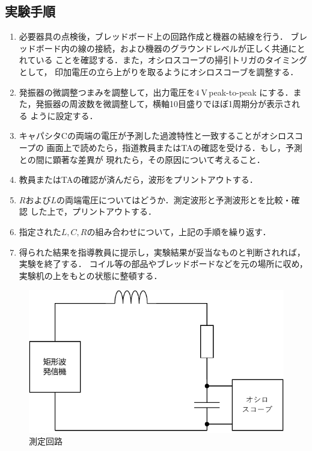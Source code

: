 \subsection{実験手順}    
    \begin{enumerate}
        \item 必要器具の点検後，ブレッドボード上の回路作成と機器の結線を行う．
        ブレッドボード内の線の接続，およひ機器のグラウンドレベルが正しく共通にとれている
        ことを確認する．また，オシロスコープの掃引トリガのタイミングとして，
        印加電圧の立ら上がりを取るようにオシロスコーブを調整する．

        \item  発振器の微調整つまみを調整して，出力電圧を$4 \mathrm{~V}$\,peak-to-peak
        にする．また，発振器の周波数を微調整して，横軸10目盛りでほぼ1周期分が表示される
        ように設定する．

        \item キャパシタCの両端の電圧が予測した過渡特性と一致することがオシロスコープの
        画面上で読めたら，指道教員またはTAの確認を受ける．もし，予測との間に顕著な差異が
        現れたら，その原因について考えること．

        \item 教員またはTAの確認が済んだら，波形をプリントアウトする．

        \item $R$および$L$の両端電圧についてはどうか．測定波形と予測波形とを比較・確認
        した上で，プリントアウトする．

        \item 指定された$L, C, R$の組み合わせについて，上記の手順を繰り返す．
        
        \item 得られた結果を指導教員に提示し，実験結果が妥当なものと判断されれば，実験を終了する．
        コイル等の部品やブレッドボードなどを元の場所に収め，実験机の上をもとの状態に整頓する．
    \end{enumerate}

\newpage

\begin{figure}[H]
    \begin{center}
        \includegraphics[]{figure2.drawio.pdf}
        \caption{測定回路}
    \end{center}
\end{figure}

